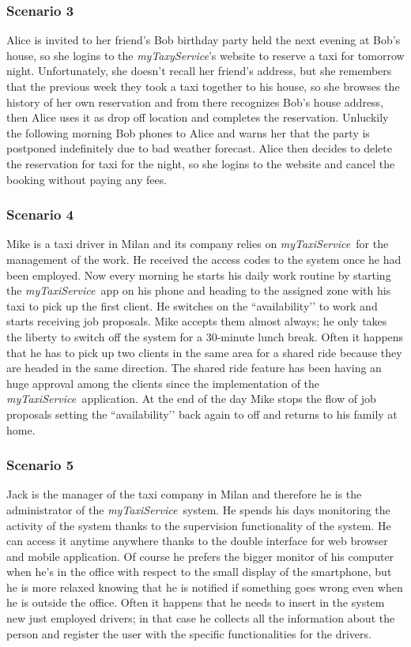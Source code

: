 \documentclass[a4paper,11pt]{report} %
\newcommand{\mts}{\mbox{\normalfont\itshape myTaxiService\ }}
\begin{document}
	\subsubsection{Scenario 3} Alice is invited to her friend’s Bob birthday party held the next evening at Bob’s house, so she logins to the {\em myTaxyService}'s website to reserve a taxi for tomorrow night. Unfortunately, she doesn’t recall her friend’s address, but she remembers that the previous week they took a taxi together to his house, so she browses the history of her own reservation and from there recognizes Bob’s house address, then Alice uses it as drop off location and completes the reservation. Unluckily the following morning Bob phones to Alice and warns her that the party is postponed indefinitely due to bad weather forecast. Alice then decides to delete the reservation for taxi for the night, so she logins to the website and cancel the booking without paying any fees.
	
	\subsubsection{Scenario 4} Mike is a taxi driver in Milan and its company relies on \mts for the management of the work. He received the access codes to the system once he had been employed. Now every morning he starts his daily work routine by starting the \mts app on his phone and heading to the assigned zone with his taxi to pick up the first client. He switches on the ``availability’’ to work and starts receiving job proposals. Mike accepts them almost always; he only takes the liberty to switch off the system for a 30-minute lunch break. Often it happens that he has to pick up two clients in the same area for a shared ride because they are headed in the same direction. The shared ride feature has been having an huge approval among the clients since the implementation of the \mts application. At the end of the day Mike stops the flow of job proposals setting the ``availability’’ back again to off and returns to his family at home.
	
	\subsubsection{Scenario 5} Jack is the manager of the taxi company in Milan and therefore he is the administrator of the \mts system. He spends his days monitoring the activity of the system thanks to the supervision functionality of the system. He can access it anytime anywhere thanks to the double interface for web browser and mobile application. Of course he prefers the bigger monitor of his computer when he’s in the office with respect to the small display of the smartphone, but he is more relaxed knowing that he is notified if something goes wrong even when he is outside the office. Often it happens that he needs to insert in the system new just employed drivers; in that case he collects all the information about the person and register the user with the specific functionalities for the drivers.
		
\end{document}
